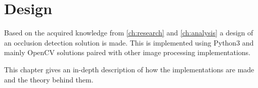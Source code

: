 \graphicspath{{figures/design/}}
\chapter{Design}\label{ch:design}
Based on the acquired knowledge from \autoref{ch:research} and \autoref{ch:analysis} a design of an occlusion detection solution is made. This is implemented using Python3 and mainly OpenCV solutions paired with other image processing implementations.

This chapter gives an in-depth description of how the implementations are made and the theory behind them.


%
%
%
%
%
%
